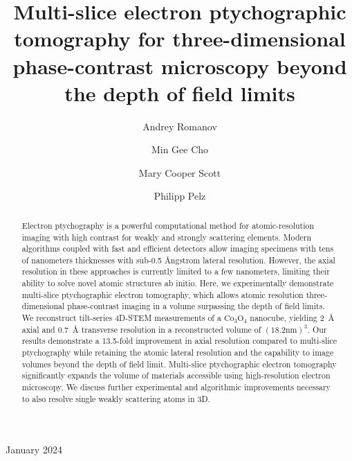 \documentclass[12pt]{iopart}
\newcommand{\FAU}{Institute of Micro- and Nanostructure Research (IMN) \& Center for Nanoanalysis and Electron Microscopy (CENEM), Friedrich Alexander-Universität Erlangen-Nürnberg, IZNF, 91058 Erlangen, Germany}
\newcommand{\UCBMaterials}{Department of Materials Science and Engineering, University of California Berkeley, Berkeley, California 94720, United States}
\newcommand{\LBLMSD}{Materials Sciences Division, Lawrence Berkeley National Laboratory, Berkeley, California 94720, United States}
\newcommand{\Foundry}{The Molecular Foundry, Lawrence Berkeley National Laboratory, Berkeley, California 94720, United
States}
\begin{document}
\title{Multi-slice electron ptychographic tomography for three-dimensional phase-contrast microscopy beyond the depth of field limits}

\author{Andrey Romanov}
\address{\FAU}
\author{Min Gee Cho}
\address{\Foundry}
\address{\UCBMaterials}
\author{Mary Cooper Scott}
\address{\UCBMaterials}
\address{\LBLMSD}
\address{\Foundry}
\author{Philipp Pelz}
\address{\FAU}
\vspace{10pt}
\begin{indented}
\item[]January 2024
\end{indented}
\begin{abstract}
Electron ptychography is a powerful computational method for atomic-resolution imaging with high contrast for weakly and strongly scattering elements. Modern algorithms coupled with fast and efficient detectors allow imaging specimens with tens of nanometers thicknesses with sub-0.5 Ångstrom lateral resolution. 
However, the axial resolution in these approaches is currently limited to a few nanometers, limiting their ability to solve novel atomic structures ab initio. Here, we experimentally demonstrate multi-slice ptychographic electron tomography, which allows atomic resolution three-dimensional phase-contrast imaging in a volume surpassing the depth of field limits. We reconstruct tilt-series 4D-STEM measurements of a $\mathrm{Co_3O_4}$ nanocube, yielding \SI{2}{\angstrom} axial and \SI{0.7}{\angstrom} transverse resolution in a reconstructed volume of $\mathrm{(18.2 nm)^3}$.
Our results demonstrate a 13.5-fold improvement in axial resolution compared to multi-slice ptychography while retaining the atomic lateral resolution and the capability to image volumes beyond the depth of field limit.
Multi-slice ptychographic electron tomography significantly expands the volume of materials accessible using high-resolution electron microscopy. We discuss further experimental and algorithmic improvements necessary to also resolve single weakly scattering atoms in 3D.
\end{abstract}
\end{document}
